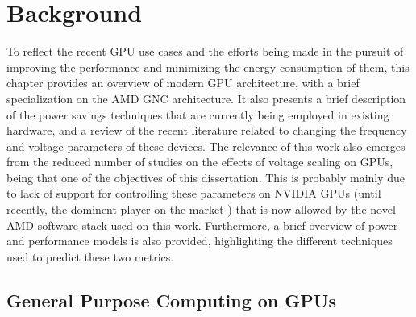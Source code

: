
\chapter{Background}
\label{chapter:stateoftheart}


To reflect the recent GPU use cases and the efforts being made in the pursuit of improving the performance and minimizing the energy consumption of them, this chapter provides an overview of modern GPU architecture, with a brief specialization on the AMD GNC architecture. It also presents a brief description of the power savings techniques that are currently being employed in existing hardware, and a review of the recent literature related to changing the frequency and voltage parameters of these devices. The relevance of this work also emerges from the reduced number of studies on the effects of voltage scaling on GPUs, being that one of the objectives of this dissertation. This is probably mainly due to lack of support for controlling these parameters on NVIDIA GPUs (until recently, the dominent player on the market \cite{noauthor_jon_2018} \cite{mujtaba_amd_2019}) that is now allowed by the novel AMD software stack used on this work. Furthermore, a brief overview of power and performance models is also provided, highlighting the different techniques used to predict these two metrics. 


\section{General Purpose Computing on GPUs}
\label{section:gpuarch}

